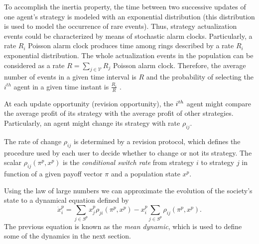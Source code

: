 To accomplish the inertia property, the time between two successive updates of one 
agent's strategy is modeled with an exponential distribution (this distribution is used to model the occurrence of rare events). 
Thus, strategy actualization events could be characterized by means of stochastic alarm clocks.
Particularly, a rate $R_i$ Poisson alarm clock produces time among rings described by
a rate $R_i$ exponential distribution.
The whole actualization events in the population can be considered as a rate $R=\sum_{j\in \mathcal{V}} R_j$ Poisson alarm clock.
Therefore, the average number of events in a given time interval is $R$ and the probability of selecting the $i^{th}$
agent in a given time instant is
 $\frac{R_i}{R}$ \cite{sandholm_book}.

At each update opportunity (revision opportunity), the $i^{th}$ agent might compare the average profit of its strategy with the average profit of other strategies. Particularly, an agent might change its strategy with rate $\rho_{ij}$.
 
 The rate of change $\rho_{ij}$ is determined by a revision protocol, which defines the procedure used by each user to decide whether to change or not its strategy. The scalar $\rho_{ij} (\pi^p, x^p)$ is the \emph{conditional switch rate} from strategy $i$ to strategy $j$ in function of a given payoff vector $\pi$ and a population state $x^p$.
 
 Using the law of large numbers we can approximate the evolution of the society's state to a dynamical equation defined by
 \begin{equation}\label{eq:mean_dynamic}
  \dot{x}_i^p = \sum_{j\in S^p} x_j^p \rho_{ji} (\pi^p, x^p) - x_i^p \sum_{j\in S^p} \rho_{ij}(\pi^p, x^p).
 \end{equation}
The previous equation is known as the \emph{mean dynamic}, which is used to define  some of the dynamics in the next section.

 